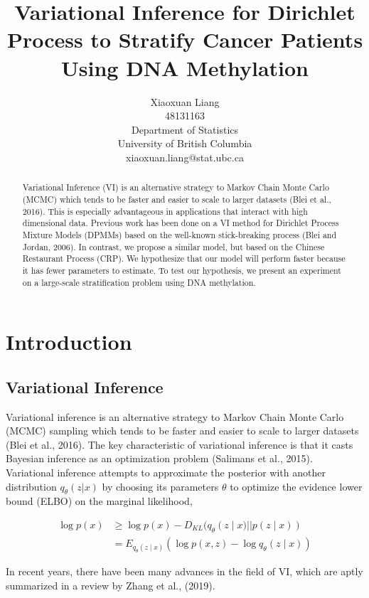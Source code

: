 \documentclass{article}
\title{Variational Inference for Dirichlet Process to Stratify Cancer
Patients Using DNA Methylation}
\author{
  Xiaoxuan Liang \\
  48131163\\
  Department of Statistics\\
  University of British Columbia\\
  xiaoxuan.liang@stat.ubc.ca
  }
\def\cond{\; | \;}
\begin{document}
\maketitle

\begin{abstract}
Variational Inference (VI) is an alternative strategy to Markov Chain Monte Carlo (MCMC) which tends to be faster and easier to scale to larger datasets (Blei et al., 2016). This is especially advantageous in applications that interact with high dimensional data. Previous work has been done on a VI method for Dirichlet Process Mixture Models (DPMMs) based on the well-known stick-breaking process (Blei and Jordan, 2006). In contrast, we propose a similar model, but based on the Chinese Restaurant Process (CRP). We hypothesize that our model will perform faster because it has fewer parameters to estimate. To test our hypothesis, we present an experiment on a large-scale stratification problem using DNA methylation.
\end{abstract}

\section{Introduction}

\subsection{Variational Inference}

Variational inference is an alternative strategy to Markov Chain Monte Carlo (MCMC) sampling which tends to be faster and easier to scale to larger datasets (Blei et al., 2016). The key characteristic of variational inference is that it casts Bayesian inference as an optimization problem (Salimans et al., 2015). Variational inference attempts to approximate the posterior with another distribution $q_\theta(z|x)$ by choosing its parameters $\theta$ to optimize the evidence lower bound (ELBO) on the marginal likelihood,

\begin{align*}
\log{p(x)} &\geq \log p(x) - D_{KL}(q_\theta(z\cond x)||p(z\cond x))\\
		   &= E_{q_\theta(z\cond x)}(\log p(x,z)-\log q_\theta (z\cond x))
\end{align*}

In recent years, there have been many advances in the field of VI, which are aptly summarized in a review by Zhang et al., (2019).
\end{document}
